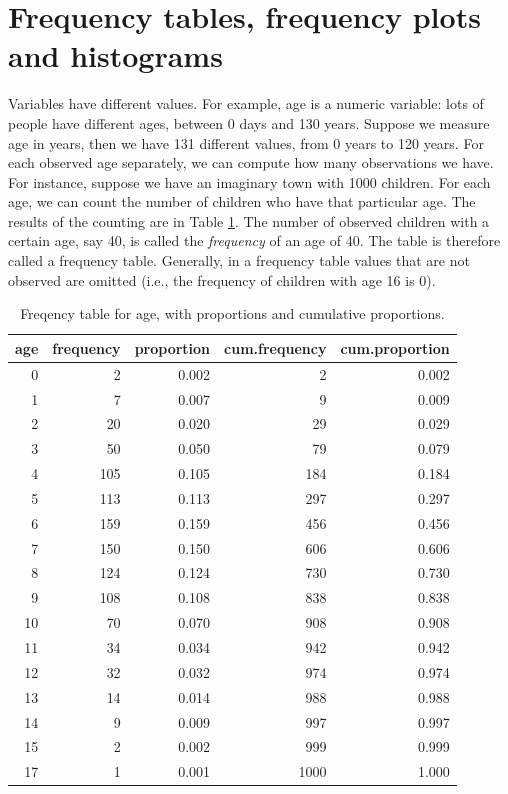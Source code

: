 \documentclass[]{report}\usepackage[]{graphicx}\usepackage[]{color}
\begin{document}
\section{Frequency tables, frequency plots and histograms}

Variables have different values. For example, age is a numeric variable: lots of people have different ages, between 0 days and 130 years. Suppose we measure age in years, then we have 131 different values, from 0 years to 120 years. For each observed age separately, we can compute how many observations we have. For instance, suppose we have an imaginary town with 1000 children. For each age, we can count the number of children who have that particular age. The results of the counting are in Table \ref{tab:frequency_1}. The number of observed children with a certain age, say 40, is called the \textit{frequency} of an age of 40. The table is therefore called a frequency table. Generally, in a frequency table values that are not observed are omitted (i.e., the frequency of children with age 16 is 0).

\begin{table}[ht]
\centering
\caption{Freqency table for age, with proportions and cumulative proportions.} 
\label{tab:frequency_1}
\begin{tabular}{rrrrr}
  \hline
age & frequency & proportion & cum.frequency & cum.proportion \\ 
  \hline
   0 &    2 & 0.002 &    2 & 0.002 \\ 
     1 &    7 & 0.007 &    9 & 0.009 \\ 
     2 &   20 & 0.020 &   29 & 0.029 \\ 
     3 &   50 & 0.050 &   79 & 0.079 \\ 
     4 &  105 & 0.105 &  184 & 0.184 \\ 
     5 &  113 & 0.113 &  297 & 0.297 \\ 
     6 &  159 & 0.159 &  456 & 0.456 \\ 
     7 &  150 & 0.150 &  606 & 0.606 \\ 
     8 &  124 & 0.124 &  730 & 0.730 \\ 
     9 &  108 & 0.108 &  838 & 0.838 \\ 
    10 &   70 & 0.070 &  908 & 0.908 \\ 
    11 &   34 & 0.034 &  942 & 0.942 \\ 
    12 &   32 & 0.032 &  974 & 0.974 \\ 
    13 &   14 & 0.014 &  988 & 0.988 \\ 
    14 &    9 & 0.009 &  997 & 0.997 \\ 
    15 &    2 & 0.002 &  999 & 0.999 \\ 
    17 &    1 & 0.001 & 1000 & 1.000 \\ 
   \hline
\end{tabular}
\end{table}
\end{document}
